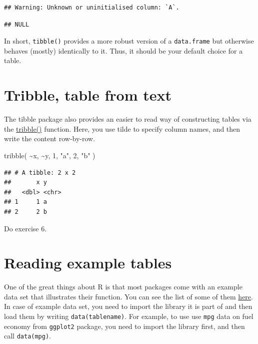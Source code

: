 \documentclass[
]{book}
\newenvironment{Shaded}{\begin{snugshade}}{\end{snugshade}}
\newcommand{\DecValTok}[1]{\textcolor[rgb]{0.00,0.00,0.81}{#1}}
\newcommand{\FunctionTok}[1]{\textcolor[rgb]{0.00,0.00,0.00}{#1}}
\newcommand{\NormalTok}[1]{#1}
\newcommand{\SpecialCharTok}[1]{\textcolor[rgb]{0.00,0.00,0.00}{#1}}
\newcommand{\StringTok}[1]{\textcolor[rgb]{0.31,0.60,0.02}{#1}}
\begin{document}
\begin{verbatim}
## Warning: Unknown or uninitialised column: `A`.
\end{verbatim}

\begin{verbatim}
## NULL
\end{verbatim}

In short, \texttt{tibble()} provides a more robust version of a \texttt{data.frame} but otherwise behaves (mostly) identically to it. Thus, it should be your default choice for a table.

\hypertarget{tribble}{%
\section{Tribble, table from text}\label{tribble}}

The tibble package also provides an easier to read way of constructing tables via the \href{https://tibble.tidyverse.org/reference/tribble.html}{tribble()} function. Here, you use tilde to specify column names, and then write the content row-by-row.

\begin{Shaded}
\begin{Highlighting}[]
\FunctionTok{tribble}\NormalTok{(}
    \SpecialCharTok{\textasciitilde{}}\NormalTok{x, }\SpecialCharTok{\textasciitilde{}}\NormalTok{y,}
    \DecValTok{1}\NormalTok{,  }\StringTok{"a"}\NormalTok{,}
    \DecValTok{2}\NormalTok{,  }\StringTok{"b"}
\NormalTok{)}
\end{Highlighting}
\end{Shaded}

\begin{verbatim}
## # A tibble: 2 x 2
##       x y    
##   <dbl> <chr>
## 1     1 a    
## 2     2 b
\end{verbatim}

Do exercise 6.

\hypertarget{data}{%
\section{Reading example tables}\label{data}}

One of the great things about R is that most packages come with an example data set that illustrates their function. You can see the list of some of them \href{https://www.rdocumentation.org/packages/datasets}{here}. In case of example data set, you need to import the library it is part of and then load them by writing \texttt{data(tablename)}. For example, to use use \texttt{mpg} data on fuel economy from \texttt{ggplot2} package, you need to import the library first, and then call \texttt{data(mpg)}.
\end{document}
